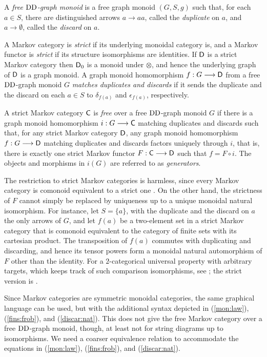 \documentclass[12pt]{amsart}
\theoremstyle{plain}
\theoremstyle{definition}
\theoremstyle{remark}
\numberwithin{equation}{section}
\theoremstyle{plain}
\newcommand{\0}{\emptyset}
\newcommand{\fun}{\longrightarrow}
\newcommand{\cat}[1]{\textup{\textsf{#1}}}
\newcommand{\memph}[1]{{\color{magenta}\emph{#1}}}
\newcommand{\DD}{\textup{DD}}
\begin{document}
A \memph{free $\DD$-graph monoid} is a free graph monoid $(G, S, g)$ such that, for each $a \in S$, there are distinguished arrows $a \fun aa$, called the \memph{duplicate} on $a$, and $a \fun \0$, called the \memph{discard} on $a$.



A Markov category is \memph{strict} if its underlying monoidal category is, and a Markov functor is \memph{strict} if its structure isomorphisms are identities. If $\cat D$ is a strict Markov category then $\cat D_0$ is a monoid under $\otimes$, and hence the underlying graph of $\cat D$ is a graph monoid. A graph monoid homomorphism $f : G \fun \cat D$ from a free $\DD$-graph monoid $G$ \memph{matches duplicates and discards} if it sends the duplicate and the discard on each $a \in S$ to $\delta_{f(a)}$ and $\epsilon_{f(a)}$, respectively.

A strict Markov category $\cat C$ is \memph{free} over a free $\DD$-graph monoid $G$ if there is a graph monoid homomorphism $i : G \fun \cat C$ matching duplicates and discards such that, for any strict Markov category $\cat D$, any graph monoid homomorphism $f : G \fun  \cat D$ matching duplicates and discards factors uniquely through $i$, that is, there is exactly one strict Markov functor $F : \cat C \fun \cat D$ such that $f = F \circ i$. The objects and morphisms in $i(G)$ are referred to as \memph{generators}.

The restriction to strict Markov categories is harmless, since every Markov category is comonoid equivalent to a strict one \cite[Theorem~10.17]{fritz2020synthetic}. On the other hand, the strictness of $F$ cannot simply be replaced by uniqueness up to a unique monoidal natural isomorphism. For instance, let $S = \{a\}$, with the duplicate and the discard on $a$ the only arrows of $G$, and let $f(a)$ be a two-element set in a strict Markov category that is comonoid equivalent to the category of finite sets with its cartesian product. The transposition of $f(a)$ commutes with duplicating and discarding, and hence its tensor powers form a monoidal natural automorphism of $F$ other than the identity. For a $2$-categorical universal property with arbitrary targets, which keeps track of such comparison isomorphisms, see \cite[Theorem~6.6]{FriLiang2022}; the strict version is \cite[Corollary~6.7]{FriLiang2022}.


Since Markov categories are symmetric monoidal categories, the same graphical language can be used, but  with the additional syntax depicted in (\ref{mon:law}), (\ref{fins:frob}), and (\ref{discar:nat}). This does not give the free  Markov category over a free $\DD$-graph monoid, though, at least not for string diagrams up to isomorphisms. We need a coarser equivalence relation to accommodate the equations in  (\ref{mon:law}), (\ref{fins:frob}), and (\ref{discar:nat}).
\end{document}
